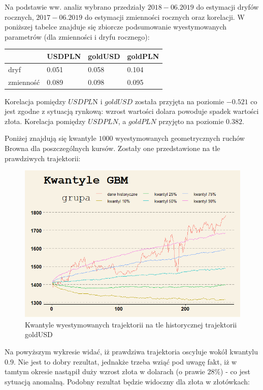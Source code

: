 \documentclass[12pt]{article}
\begin{document}
Na podstawie ww. analiz wybrano przedziały $2018 - 06.2019$ do estymacji dryfów rocznych, $2017 - 06.2019$ do estymacji zmienności rocznych oraz korelacji. W poniższej tabelce znajduje się zbiorcze podsumowanie wyestymowanych parametrów (dla zmienności i dryfu rocznego):

\begin{table}[h]
\begin{tabular}{|l|l|l|l|}
\hline
          & USDPLN & goldUSD & goldPLN \\ \hline
dryf      & 0.051  & 0.058   & 0.104   \\ \hline
zmienność & 0.089  & 0.098   & 0.095   \\ \hline
\end{tabular}
\end{table}

Korelacja pomiędzy $USDPL$N i $goldUSD$ została przyjęta na poziomie $-0.521$ co jest zgodne z sytuacją rynkową: wzrost wartości dolara powoduje spadek wartości złota. Korelacja pomiędzy $USDPLN$, a $goldPLN$ przyjęto na poziomie $0.382$.
\newline

Poniżej znajdują się kwantyle $1000$ wyestymowanych geometrycznych ruchów Browna dla poszczególnych kursów. Zostały one przedstawione na tle prawdziwych trajektorii:
\newpage
\begin{figure}[ht!]
\centering
\includegraphics[width=\linewidth]{kwantyle_GBM_GOLD.png}
\caption{Kwantyle wyestymowanych trajektorii na tle historycznej trajektorii goldUSD}
\end{figure}
 
 Na powyższym wykresie widać, iż prawdziwa trajektoria oscyluje wokół kwantylu $0.9$. Nie jest to dobry rezultat, jednakże trzeba wziąć pod uwagę fakt, iż w tamtym okresie nastąpił duży wzrost złota w dolarach (o prawie $28\%$) - co jest sytuacją anomalną. 
 \newline
 Podobny rezultat będzie widoczny dla złota w złotówkach:
 
\end{document}
